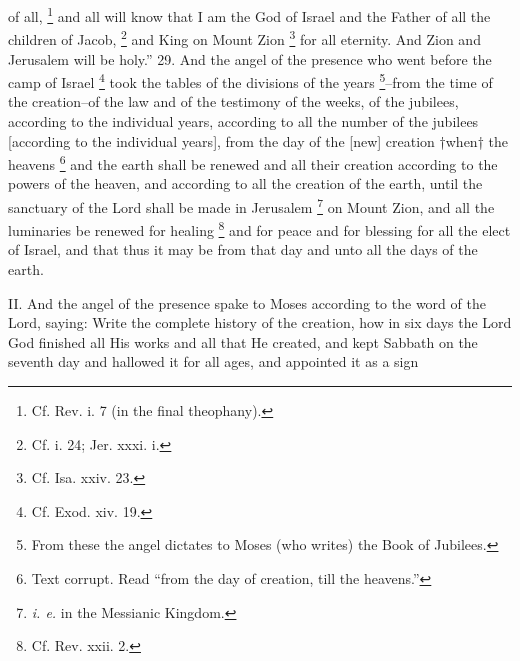of all, \footnote{Cf. Rev. i. 7 (in the final theophany).} and all will know that I am the God of Israel and the Father of all the children of Jacob, \footnote{Cf. i. 24; Jer. xxxi. i.} and King on Mount Zion \footnote{Cf. Isa. xxiv. 23.} for all eternity. And Zion and Jerusalem will be holy.'' 29. And the angel of the presence who went before the camp of Israel \footnote{Cf. Exod. xiv. 19.} took the tables of the divisions of the years \footnote{From these the angel dictates to Moses (who writes) the Book of Jubilees.}--from the time of the creation--of the law and of the testimony of the weeks, of the jubilees, according to the individual years, according to all the number of the jubilees [according to the individual years], from the day of the [new] creation †when† the heavens \footnote{Text corrupt. Read ``from the day of creation, till the heavens.''} and the earth shall be renewed and all their creation according to the powers of the heaven, and according to all the creation of the earth, until the sanctuary of the Lord shall be made in Jerusalem \footnote{\emph{i. e.} in the Messianic Kingdom.} on Mount Zion, and all the luminaries be renewed for healing \footnote{Cf. Rev. xxii. 2.} and for peace and for blessing for all the elect of Israel, and that thus it may be from that day and unto all the days of the earth.


II. And the angel of the presence spake to Moses according to the word of the Lord, saying: Write the complete history of the creation, how in six days the Lord God finished all His works and all that He created, and kept Sabbath on the seventh day and hallowed it for all ages, and appointed it as a sign

